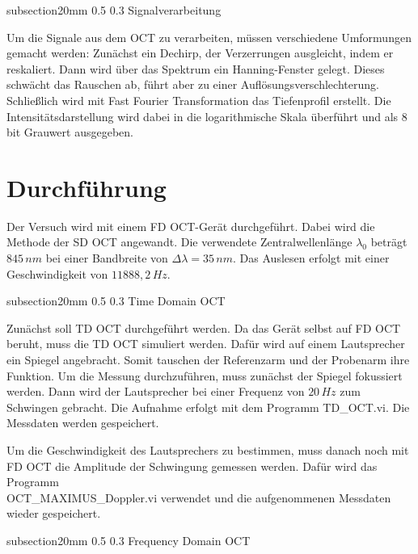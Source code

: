 \documentclass[german, %
parskip=full, %
bibliography=totoc, %
]{scrartcl}
\makeatletter
\renewcommand\subsection{\@startsection 
   {subsection}{2}{0mm}%
   {0.5\baselineskip}%
   {0.3\baselineskip}%
   {\bfseries\sffamily\large}%
   }
\makeatother
\begin{document}
\subsection{Signalverarbeitung}

Um die Signale aus dem OCT zu verarbeiten, müssen verschiedene Umformungen gemacht werden: Zunächst ein Dechirp, der Verzerrungen ausgleicht, indem er reskaliert. Dann wird über das Spektrum ein Hanning-Fenster gelegt. Dieses schwächt das Rauschen ab, führt aber zu einer Auflösungsverschlechterung. Schließlich wird mit Fast Fourier Transformation das Tiefenprofil erstellt. Die Intensitätsdarstellung wird dabei in die logarithmische Skala überführt und als 8\,bit Grauwert ausgegeben.

\section{Durchführung}

Der Versuch wird mit einem FD OCT-Gerät durchgeführt. Dabei wird die Methode der SD OCT angewandt. Die verwendete Zentralwellenlänge $\lambda_0$ beträgt $845\,nm$ bei einer Bandbreite von $\Delta \lambda = 35\,nm$. Das Auslesen erfolgt mit einer Geschwindigkeit von $11888,2\,Hz$.

\subsection{Time Domain OCT}

Zunächst soll TD OCT durchgeführt werden. Da das Gerät selbst auf FD OCT beruht, muss die TD OCT simuliert werden. Dafür wird auf einem Lautsprecher ein Spiegel angebracht. Somit tauschen der Referenzarm und der Probenarm ihre Funktion. Um die Messung durchzuführen, muss zunächst der Spiegel fokussiert werden. Dann wird der Lautsprecher bei einer Frequenz von $20\,Hz$ zum Schwingen gebracht. Die Aufnahme erfolgt mit dem Programm TD\_OCT.vi. Die Messdaten werden gespeichert.

Um die Geschwindigkeit des Lautsprechers zu bestimmen, muss danach noch mit FD OCT die Amplitude der Schwingung gemessen werden. Dafür wird das Programm \\ OCT\_MAXIMUS\_Doppler.vi verwendet und die aufgenommenen Messdaten wieder gespeichert. 

\subsection{Frequency Domain OCT}
\end{document}
